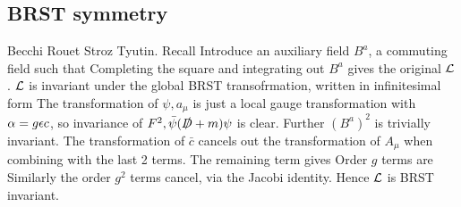 \documentclass{article}
\begin{document}
\subsection{BRST symmetry}
Becchi Rouet Stroz Tyutin. Recall
Introduce an auxiliary field $B^a$, a commuting field such that 
Completing the square and integrating out $B^a$ gives the original $\mathcal{L}$. $\mathcal{L}$ is invariant under the global BRST transofrmation, written in infinitesimal form 
The transformation of $\psi, a_\mu$ is just a local gauge transformation with $\alpha = g\epsilon c$, so invariance of $F^2, \bar{\psi}(\slashed{D}+m)\psi$ is clear. Further $(B^a)^2$ is trivially invariant. The transformation of $\bar{c}$ cancels out the transformation of $A_\mu$ when combining with the last 2 terms. The remaining term gives 
Order $g$ terms are 
Similarly the order $g^2$ terms cancel, via the Jacobi identity. Hence $\mathcal{L}$ is BRST invariant. 
\end{document}
